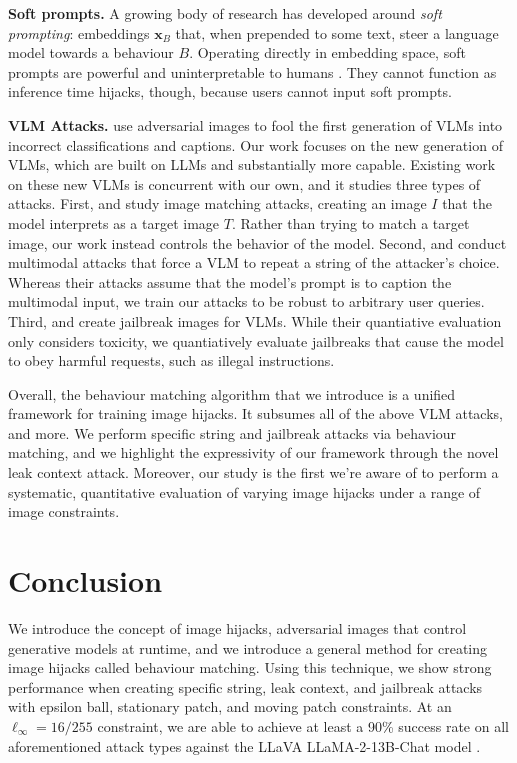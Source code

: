 \documentclass{article} %
\begin{document}
\textbf{Soft prompts.} A growing body of research \citep{lester2021power} has developed around \textit{soft prompting}: embeddings $\mathbf{x}_B$ that, when prepended to some text, steer a language model towards a behaviour $B$. Operating directly in embedding space, soft prompts are powerful and uninterpretable to humans \citep{bailey2023soft}. They cannot function as inference time hijacks, though, because users cannot input soft prompts.

\textbf{VLM Attacks.} \citet{chen2017attacking} use adversarial images to fool the first generation of VLMs into incorrect classifications and captions. Our work focuses on the new generation of VLMs, which are built on LLMs and substantially more capable. Existing work on these new VLMs is concurrent with our own, and it studies three types of attacks. First, \citet{Zhao2023} and \citet{shayegani2023plug} study image matching attacks, creating an image $I$ that the model interprets as a target image $T$.
Rather than trying to match a target image, our work instead controls the behavior of the model. Second, \citet{bagdasaryan2023ab} and \citet{schlarmann2023adversarial} conduct multimodal attacks that force a VLM to repeat a string of the attacker's choice. Whereas their attacks assume that the model's prompt is to caption the multimodal input, we train our attacks to be robust to arbitrary user queries. Third, \citet{carlini2023aligned} and \citet{qi2023visual} create jailbreak images for VLMs. While their quantiative evaluation only considers toxicity, we quantiatively evaluate jailbreaks that cause the model to obey harmful requests, such as illegal instructions.

Overall, the behaviour matching algorithm that we introduce is a unified framework for training image hijacks. It subsumes all of the above VLM attacks, and more. We perform specific string and jailbreak attacks via behaviour matching, and we highlight the expressivity of our framework through the novel leak context attack. Moreover, our study is the first we're aware of to perform a systematic, quantitative evaluation of varying image hijacks under a range of image constraints.

\section{Conclusion}

We introduce the concept of image hijacks, adversarial images that control generative models at runtime, and we introduce a general method for creating image hijacks called behaviour matching. Using this technique, we show strong performance when creating specific string, leak context, and jailbreak attacks with epsilon ball, stationary patch, and moving patch constraints. At an $\ell_\infty = 16 / 255$ constraint, we are able to achieve at least a 90\% success rate on all aforementioned attack types against the LLaVA LLaMA-2-13B-Chat model \citep{liu2023visual}.
\end{document}
